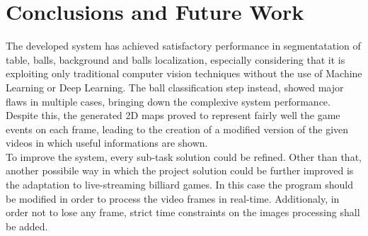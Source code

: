 \section{Conclusions and Future Work}


The developed system has achieved satisfactory performance in segmentatation of table, balls, background and balls localization, especially considering 
that it is exploiting only traditional computer vision techniques without the use of Machine Learning or Deep Learning.
The ball classification step instead, showed major flaws in multiple cases, bringing down the complexive system performance. 
Despite this, the generated 2D maps proved to represent fairly well the game events on each frame, leading to the creation of a modified version
of the given videos in which useful informations are shown. 
\newline \\
To improve the system, every sub-task solution could be refined.
Other than that, another possibile way in which the project solution could be further improved is the adaptation to live-streaming billiard games. In this case the program should be modified
in order to process the video frames in real-time. Additionaly, in order not to lose any frame, strict time constraints on the images processing shall be added. 